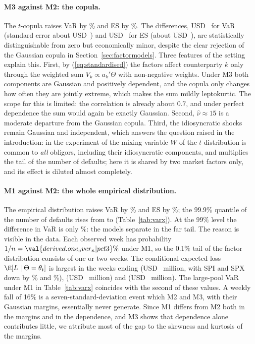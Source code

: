 \paragraph{M3 against M2: the copula.}
The $t$-copula raises VaR by \% and ES by \%. The differences, USD~ for VaR (standard error about USD~) and USD~ for ES (about USD~), are statistically distinguishable from zero but economically minor, despite the clear rejection of the Gaussian copula in Section~\ref{sec:factormodels}. Three features of the setting explain this. First, by (\ref{eq:standardised}) the factors affect counterparty $k$ only through the weighted sum $V_k\propto a_k'\Theta$ with non-negative weights. Under M3 both components are Gaussian and positively dependent, and the copula only changes how often they are jointly extreme, which makes the sum mildly leptokurtic. The scope for this is limited: the correlation is already about $0.7$, and under perfect dependence the sum would again be exactly Gaussian. Second, $\hat\nu\approx15$ is a moderate departure from the Gaussian copula. Third, the idiosyncratic shocks remain Gaussian and independent, which answers the question raised in the introduction: in the experiment of \citet[Table~8.4]{McNeil05} the mixing variable $W$ of the $t$ distribution is common to \emph{all} obligors, including their idiosyncratic components, and multiplies the tail of the number of defaults; here it is shared by two market factors only, and its effect is diluted almost completely.

\paragraph{M1 against M2: the whole empirical distribution.}
The empirical distribution raises VaR by \% and ES by \%; the $99.9\%$ quantile of the number of defaults rises from  to  (Table~\ref{tab:varx}). At the $99\%$ level the difference in VaR is only \%: the models separate in the far tail. The reason is visible in the data. Each observed week has probability $1/n=\val{derived.one_over_n|pct3}\%$ under M1, so the $0.1\%$ tail of the factor distribution consists of one or two weeks. The conditional expected loss $\E[L\mid\Theta=\theta_t]$ is largest in the weeks ending  (USD~ million, with SPI and SPX down by \% and \%),  (USD~ million) and  (USD~ million). The large-pool VaR under M1 in Table~\ref{tab:varx} coincides with the second of these values. A weekly fall of 16\% is a seven-standard-deviation event which M2 and M3, with their Gaussian margins, essentially never generate. Since M1 differs from M2 both in the margins and in the dependence, and M3 shows that dependence alone contributes little, we attribute most of the gap to the skewness and kurtosis of the margins.

